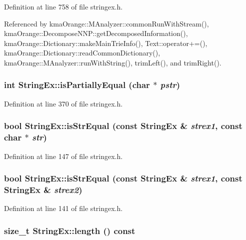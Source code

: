 Definition at line 758 of file stringex.h.

Referenced by kmaOrange::MAnalyzer::commonRunWithStream(), kmaOrange::DecomposeNNP::getDecomposedInformation(), kmaOrange::Dictionary::makeMainTrieInfo(), Text::operator+=(), kmaOrange::Dictionary::readCommonDictionary(), kmaOrange::MAnalyzer::runWithString(), trimLeft(), and trimRight().\hypertarget{classStringEx_abbdf798181433adcf54a4924e4ae566}{
\subsubsection[{isPartiallyEqual}]{\setlength{\rightskip}{0pt plus 5cm}int StringEx::isPartiallyEqual (char $\ast$ {\em pstr})}}
\label{classStringEx_abbdf798181433adcf54a4924e4ae566}




Definition at line 370 of file stringex.h.\hypertarget{classStringEx_007fa6803dbc3544d17eaba7b8d56a07}{
\subsubsection[{isStrEqual}]{\setlength{\rightskip}{0pt plus 5cm}bool StringEx::isStrEqual (const {\bf StringEx} \& {\em strex1}, \/  const char $\ast$ {\em str})}}
\label{classStringEx_007fa6803dbc3544d17eaba7b8d56a07}




Definition at line 147 of file stringex.h.\hypertarget{classStringEx_61b66936040c448bf70622d9790d0a9f}{
\subsubsection[{isStrEqual}]{\setlength{\rightskip}{0pt plus 5cm}bool StringEx::isStrEqual (const {\bf StringEx} \& {\em strex1}, \/  const {\bf StringEx} \& {\em strex2})}}
\label{classStringEx_61b66936040c448bf70622d9790d0a9f}




Definition at line 141 of file stringex.h.\hypertarget{classStringEx_d377a20ec6e6ca28e8c470189903a87d}{
\subsubsection[{length}]{\setlength{\rightskip}{0pt plus 5cm}size\_\-t StringEx::length () const}}
\label{classStringEx_d377a20ec6e6ca28e8c470189903a87d}




